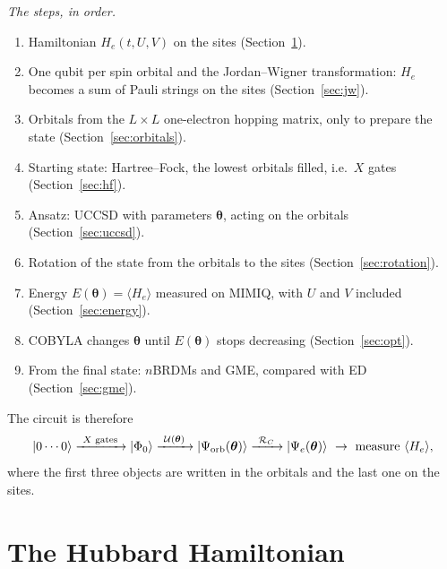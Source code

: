 \documentclass[11pt,a4paper]{article}
\begin{document}
\emph{The steps, in order.}
\begin{enumerate}
  \item Hamiltonian $H_e(t,U,V)$ on the sites (Section~\ref{sec:H}).
  \item One qubit per spin orbital and the Jordan--Wigner transformation:
    $H_e$ becomes a sum of Pauli strings on the sites (Section~\ref{sec:jw}).
  \item Orbitals from the $L \times L$ one-electron hopping matrix, only to
    prepare the state (Section~\ref{sec:orbitals}).
  \item Starting state: Hartree--Fock, the lowest orbitals filled, i.e.\ $X$
    gates (Section~\ref{sec:hf}).
  \item Ansatz: UCCSD with parameters $\boldsymbol\theta$, acting on the
    orbitals (Section~\ref{sec:uccsd}).
  \item Rotation of the state from the orbitals to the sites
    (Section~\ref{sec:rotation}).
  \item Energy $E(\boldsymbol\theta) = \langle H_e \rangle$ measured on MIMIQ,
    with $U$ and $V$ included (Section~\ref{sec:energy}).
  \item COBYLA changes $\boldsymbol\theta$ until $E(\boldsymbol\theta)$ stops
    decreasing (Section~\ref{sec:opt}).
  \item From the final state: $n$BRDMs and GME, compared with ED
    (Section~\ref{sec:gme}).
\end{enumerate}
The circuit is therefore
\begin{equation*}
  |0\cdots0\rangle
  \xrightarrow{\ X \text{ gates}\ } |\Phi_0\rangle
  \xrightarrow{\ \mathcal{U}(\boldsymbol\theta)\ } |\Psi_{\rm orb}(\boldsymbol\theta)\rangle
  \xrightarrow{\ \mathcal{R}_C\ } |\Psi_e(\boldsymbol\theta)\rangle
  \ \to\ \text{measure } \langle H_e\rangle ,
\end{equation*}
where the first three objects are written in the orbitals and the last one on
the sites.

\section{The Hubbard Hamiltonian}\label{sec:H}
\end{document}
